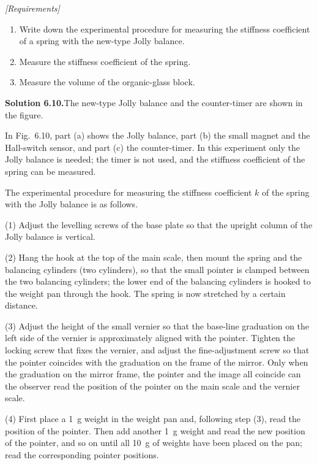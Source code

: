 \noindent\textit{[Requirements]}
\begin{enumerate}[label=(\arabic*),leftmargin=2.2em,itemsep=1pt,topsep=2pt]
\item Write down the experimental procedure for measuring the stiffness coefficient of a spring with the new-type Jolly balance.
\item Measure the stiffness coefficient of the spring.
\item Measure the volume of the organic-glass block.
\end{enumerate}

\medskip
\noindent\textbf{Solution 6.10.}\quad The new-type Jolly balance and the counter-timer are shown in the figure.

In Fig.~6.10, part (a) shows the Jolly balance, part (b) the small magnet and the Hall-switch sensor, and part (c) the counter-timer. In this experiment only the Jolly balance is needed; the timer is not used, and the stiffness coefficient of the spring can be measured.

The experimental procedure for measuring the stiffness coefficient $k$ of the spring with the Jolly balance is as follows.

(1) Adjust the levelling screws of the base plate so that the upright column of the Jolly balance is vertical.

(2) Hang the hook at the top of the main scale, then mount the spring and the balancing cylinders (two cylinders), so that the small pointer is clamped between the two balancing cylinders; the lower end of the balancing cylinders is hooked to the weight pan through the hook. The spring is now stretched by a certain distance.

(3) Adjust the height of the small vernier so that the base-line graduation on the left side of the vernier is approximately aligned with the pointer. Tighten the locking screw that fixes the vernier, and adjust the fine-adjustment screw so that the pointer coincides with the graduation on the frame of the mirror. Only when the graduation on the mirror frame, the pointer and the image all coincide can the observer read the position of the pointer on the main scale and the vernier scale.

(4) First place a \SI{1}{g} weight in the weight pan and, following step (3), read the position of the pointer. Then add another \SI{1}{g} weight and read the new position of the pointer, and so on until all \SI{10}{g} of weights have been placed on the pan; read the corresponding pointer positions.

